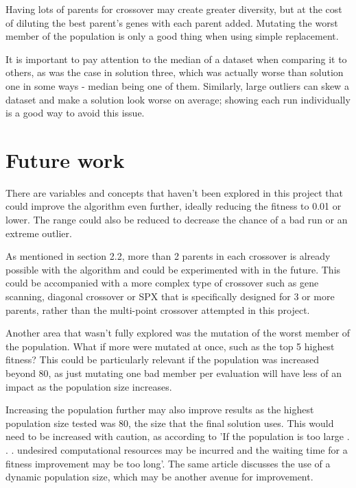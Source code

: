 \documentclass[sigconf]{acmart}
\begin{document}
Having lots of parents for crossover may create greater diversity, but at the cost of diluting the best parent's genes with each parent added. Mutating the worst member of the population is only a good thing when using simple replacement.

It is important to pay attention to the median of a dataset when comparing it to others, as was the case in solution three, which was actually worse than solution one in some ways - median being one of them. Similarly, large outliers can skew a dataset and make a solution look worse on average; showing each run individually is a good way to avoid this issue.
\section{Future work}
There are variables and concepts that haven't been explored in this project that could improve the algorithm even further, ideally reducing the fitness to 0.01 or lower. The range could also be reduced to decrease the chance of a bad run or an extreme outlier.

As mentioned in section 2.2, more than 2 parents in each crossover is already possible with the algorithm and could be experimented with in the future. This could be accompanied with a more complex type of crossover such as gene scanning, diagonal crossover \cite{multiParent2} or SPX \cite{multipleParents} that is specifically designed for 3 or more parents, rather than the multi-point crossover attempted in this project.

Another area that wasn't fully explored was the mutation of the worst member of the population. What if more were mutated at once, such as the top 5 highest fitness? This could be particularly relevant if the population was increased beyond 80, as just mutating one bad member per evaluation will have less of an impact as the population size increases.

Increasing the population further may also improve results as the highest population size tested was 80, the size that the final solution uses. This would need to be increased with caution, as according to \cite{popSize} 'If the population is too large . . . undesired computational resources may be incurred and the waiting time for a fitness improvement may be too long'. The same article discusses the use of a dynamic population size, which may be another avenue for improvement.

 
\end{document}

